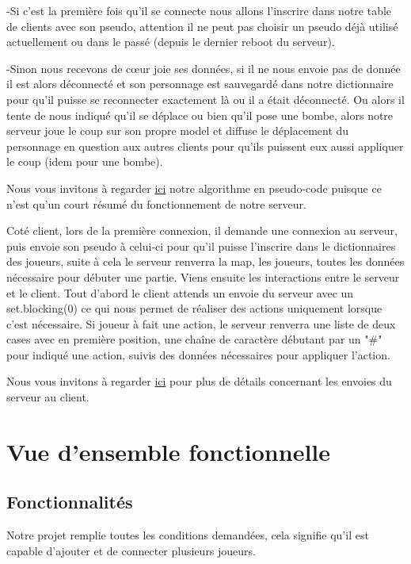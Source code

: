 \documentclass[12pt]{article}
\begin{document}
    -Si c'est la première fois qu'il se connecte nous allons l'inscrire dans notre table de clients avec son pseudo, attention il ne peut pas choisir un pseudo déjà utilisé actuellement ou dans le passé (depuis le dernier reboot du serveur).

    -Sinon nous recevons de cœur joie ses données, si il ne nous envoie pas de donnée il est alors déconnecté et son personnage est sauvegardé dans notre dictionnaire pour qu'il puisse se reconnecter exactement là ou il a était déconnecté.
    Ou alors il tente de nous indiqué qu'il se déplace ou bien qu'il pose une bombe, alors notre serveur joue le coup sur son propre model et diffuse le déplacement du personnage en question aux autres clients pour qu'ils puissent eux aussi appliquer le coup (idem pour une bombe).

    Nous vous invitons à regarder \hyperref[code]{ici} notre algorithme en pseudo-code puisque ce n'est qu'un court résumé du fonctionnement de notre serveur.

    Coté client, lors de la première connexion, il demande une connexion au serveur, puis envoie son pseudo à celui-ci pour qu'il puisse l'inscrire dans le dictionnaires des joueurs, suite à cela le serveur renverra la map, les joueurs, toutes les données nécessaire pour débuter une partie.
    Viens ensuite les interactions entre le serveur et le client. Tout d'abord le client attends un envoie du serveur avec un set.blocking(0) ce qui nous permet de réaliser des actions uniquement lorsque c'est nécessaire. Si joueur à fait une action, le serveur renverra une liste de deux cases avec en première position, une chaîne de caractère débutant par un "#" pour indiqué une action, suivis des données nécessaires pour appliquer l'action.

    Nous vous invitons à regarder \hyperref[code]{ici} pour plus de détails concernant les envoies du serveur au client.
    \clearpage
    \section{Vue d'ensemble fonctionnelle}
        \subsection{Fonctionnalités}
        Notre projet remplie toutes les conditions demandées, cela signifie qu'il est capable d'ajouter et de connecter plusieurs joueurs.
\end{document}
